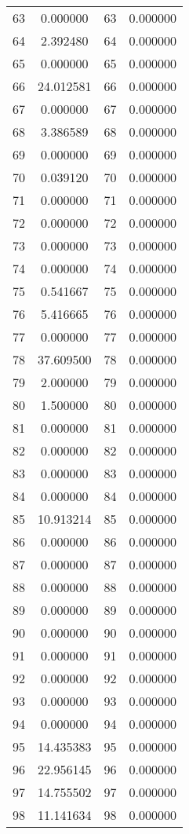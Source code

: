 \documentclass[12pt]{article}
\begin{document}
\begin{longtable}{@{}cccc@{}}
63 & 0.000000 & 63 & 0.000000 \\
64 & 2.392480 & 64 & 0.000000 \\
65 & 0.000000 & 65 & 0.000000 \\
66 & 24.012581 & 66 & 0.000000 \\
67 & 0.000000 & 67 & 0.000000 \\
68 & 3.386589 & 68 & 0.000000 \\
69 & 0.000000 & 69 & 0.000000 \\
70 & 0.039120 & 70 & 0.000000 \\
71 & 0.000000 & 71 & 0.000000 \\
72 & 0.000000 & 72 & 0.000000 \\
73 & 0.000000 & 73 & 0.000000 \\
74 & 0.000000 & 74 & 0.000000 \\
75 & 0.541667 & 75 & 0.000000 \\
76 & 5.416665 & 76 & 0.000000 \\
77 & 0.000000 & 77 & 0.000000 \\
78 & 37.609500 & 78 & 0.000000 \\
79 & 2.000000 & 79 & 0.000000 \\
80 & 1.500000 & 80 & 0.000000 \\
81 & 0.000000 & 81 & 0.000000 \\
82 & 0.000000 & 82 & 0.000000 \\
83 & 0.000000 & 83 & 0.000000 \\
84 & 0.000000 & 84 & 0.000000 \\
85 & 10.913214 & 85 & 0.000000 \\
86 & 0.000000 & 86 & 0.000000 \\
87 & 0.000000 & 87 & 0.000000 \\
88 & 0.000000 & 88 & 0.000000 \\
89 & 0.000000 & 89 & 0.000000 \\
90 & 0.000000 & 90 & 0.000000 \\
91 & 0.000000 & 91 & 0.000000 \\
92 & 0.000000 & 92 & 0.000000 \\
93 & 0.000000 & 93 & 0.000000 \\
94 & 0.000000 & 94 & 0.000000 \\
95 & 14.435383 & 95 & 0.000000 \\
96 & 22.956145 & 96 & 0.000000 \\
97 & 14.755502 & 97 & 0.000000 \\
98 & 11.141634 & 98 & 0.000000 \\

\end{longtable}
\end{document}
